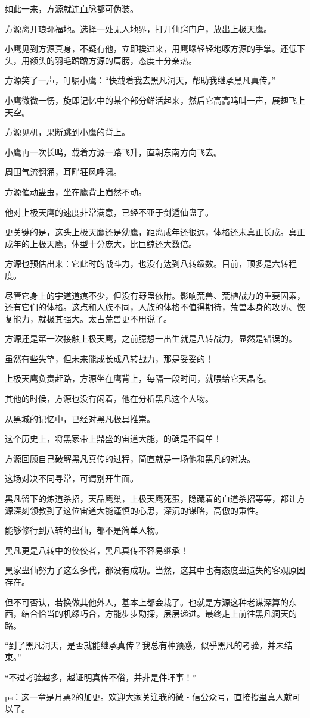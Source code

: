 \begin{this_body}
如此一来，方源就连血脉都可伪装。

方源离开琅琊福地。选择一处无人地界，打开仙窍门户，放出上极天鹰。

小鹰见到方源真身，不疑有他，立即挨过来，用鹰喙轻轻地啄方源的手掌。还低下头，用额头的羽毛蹭蹭方源的肩膀，态度十分亲热。

方源笑了一声，叮嘱小鹰：“快载着我去黑凡洞天，帮助我继承黑凡真传。”

小鹰微微一愣，旋即记忆中的某个部分鲜活起来，然后它高高鸣叫一声，展翅飞上天空。

方源见机，果断跳到小鹰的背上。

小鹰再一次长鸣，载着方源一路飞升，直朝东南方向飞去。

周围气流翻涌，耳畔狂风呼啸。

方源催动蛊虫，坐在鹰背上岿然不动。

他对上极天鹰的速度非常满意，已经不亚于剑遁仙蛊了。

更关键的是，这头上极天鹰还是幼鹰，距离成年还很远，体格还未真正长成。真正成年的上极天鹰，体型十分庞大，比巨鲸还大数倍。

方源也预估出来：它此时的战斗力，也没有达到八转级数。目前，顶多是六转程度。

尽管它身上的宇道道痕不少，但没有野蛊依附。影响荒兽、荒植战力的重要因素，还有它们的体格。这点和人族不同，人族的体格不值得期待，荒兽本身的攻防、恢复能力，就极其强大。太古荒兽更不用说了。

方源还是第一次接触上极天鹰，之前臆想一出生就是八转战力，显然是错误的。

虽然有些失望，但未来能成长成八转战力，那是妥妥的！

上极天鹰负责赶路，方源坐在鹰背上，每隔一段时间，就喂给它天晶吃。

其他的时候，方源也没有闲着，他在分析黑凡这个人物。

从黑城的记忆中，已经对黑凡极具推崇。

这个历史上，将黑家带上鼎盛的宙道大能，的确是不简单！

方源回顾自己破解黑凡真传的过程，简直就是一场他和黑凡的对决。

这场对决不同寻常，可谓别开生面。

黑凡留下的炼道杀招，天晶鹰巢，上极天鹰死蛋，隐藏着的血道杀招等等，都让方源深刻领教到了这位宙道大能谨慎的心思，深沉的谋略，高傲的秉性。

能够修行到八转的蛊仙，都不是简单人物。

黑凡更是八转中的佼佼者，黑凡真传不容易继承！

黑家蛊仙努力了这么多代，都没有成功。当然，这其中也有态度蛊遗失的客观原因存在。

但不可否认，若换做其他外人，基本上都会栽了。也就是方源这种老谋深算的东西，结合恰当的机缘巧合，方能步步勘探，层层递进。最终走上前往黑凡洞天的路。

“到了黑凡洞天，是否就能继承真传？我总有种预感，似乎黑凡的考验，并未结束。”

“不过考验越多，越证明真传不俗，并非是件坏事！”

ps：这一章是月票2的加更。欢迎大家关注我的微・信公众号，直接搜蛊真人就可以了。

\end{this_body}

